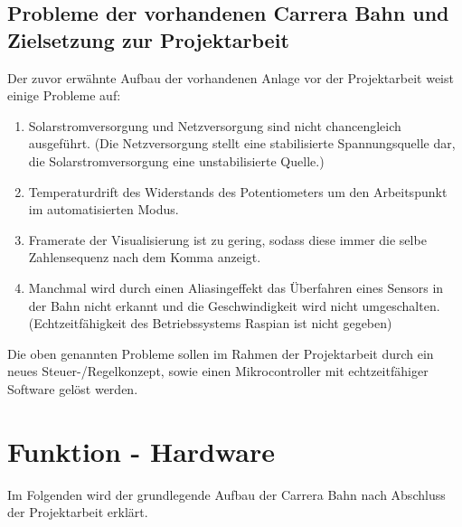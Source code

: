 \documentclass[a4paper, 11pt]{report}
\begin{document}
\section{Probleme der vorhandenen Carrera Bahn und Zielsetzung zur Projektarbeit}\label{sec:ziel}
Der zuvor erwähnte Aufbau der vorhandenen Anlage vor der Projektarbeit weist einige Probleme auf:
\begin{enumerate}
	\item Solarstromversorgung und Netzversorgung sind nicht chancengleich ausgeführt. (Die Netzversorgung stellt eine stabilisierte Spannungsquelle dar, die Solarstromversorgung eine unstabilisierte Quelle.)
	\item Temperaturdrift des Widerstands des Potentiometers um den Arbeitspunkt im automatisierten Modus.
	\item Framerate der Visualisierung ist zu gering, sodass diese immer die selbe Zahlensequenz nach dem Komma anzeigt.
	\item Manchmal wird durch einen Aliasingeffekt das Überfahren eines Sensors in der Bahn nicht erkannt und die Geschwindigkeit wird nicht umgeschalten. (Echtzeitfähigkeit des Betriebssystems Raspian ist nicht gegeben)
\end{enumerate}
Die oben genannten Probleme sollen im Rahmen der Projektarbeit durch ein neues Steuer-/Regelkonzept, sowie einen Mikrocontroller mit echtzeitfähiger Software gelöst werden.


\chapter{Funktion - Hardware}
	Im Folgenden wird der grundlegende Aufbau der Carrera Bahn nach Abschluss der Projektarbeit erklärt.
\end{document}
